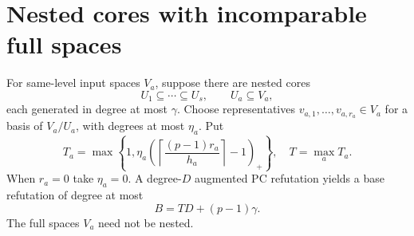 \section{Nested cores with incomparable full spaces}
\begin{theorem}\label{thm:cores}
For same-level input spaces $V_a$, suppose there are nested cores
\[
 U_1\subseteq\cdots\subseteq U_s,\qquad U_a\subseteq V_a,
\]
each generated in degree at most $\gamma$. Choose representatives $v_{a,1},\ldots,v_{a,r_a}\in V_a$ for a basis of $V_a/U_a$, with degrees at most $\eta_a$. Put
\[
 T_a=\max\left\{1,\eta_a
 \left(\left\lceil\frac{(p-1)r_a}{h_a}\right\rceil-1\right)_+\right\},
 \quad T=\max_aT_a.
\]
When $r_a=0$ take $\eta_a=0$. A degree-$D$ augmented PC refutation yields a base refutation of degree at most
\[
 \boxed{B=TD+(p-1)\gamma.}
\]
The full spaces $V_a$ need not be nested.
\end{theorem}
